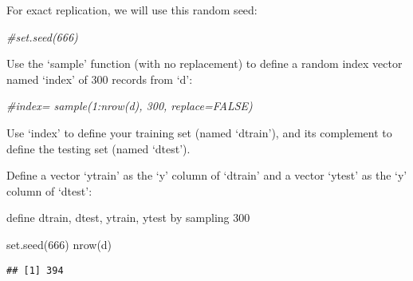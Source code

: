 \documentclass[
]{article}
\newenvironment{Shaded}{\begin{snugshade}}{\end{snugshade}}
\newcommand{\AttributeTok}[1]{\textcolor[rgb]{0.77,0.63,0.00}{#1}}
\newcommand{\CommentTok}[1]{\textcolor[rgb]{0.56,0.35,0.01}{\textit{#1}}}
\newcommand{\DecValTok}[1]{\textcolor[rgb]{0.00,0.00,0.81}{#1}}
\newcommand{\FunctionTok}[1]{\textcolor[rgb]{0.00,0.00,0.00}{#1}}
\newcommand{\NormalTok}[1]{#1}
\newcommand{\OtherTok}[1]{\textcolor[rgb]{0.56,0.35,0.01}{#1}}
\newcommand{\SpecialCharTok}[1]{\textcolor[rgb]{0.00,0.00,0.00}{#1}}
\begin{document}
For exact replication, we will use this random seed:

\begin{Shaded}
\begin{Highlighting}[]
\CommentTok{\#set.seed(666)}
\end{Highlighting}
\end{Shaded}

Use the `sample' function (with no replacement) to define a random index
vector named `index' of 300 records from `d':

\begin{Shaded}
\begin{Highlighting}[]
\CommentTok{\#index= sample(1:nrow(d), 300, replace=FALSE)}
\end{Highlighting}
\end{Shaded}

Use `index' to define your training set (named `dtrain'), and its
complement to define the testing set (named `dtest').

Define a vector `ytrain' as the `y' column of `dtrain' and a vector
`ytest' as the `y' column of `dtest':

\begin{Shaded}
\end{Shaded}

define dtrain, dtest, ytrain, ytest by sampling 300

\begin{Shaded}
\begin{Highlighting}[]
\FunctionTok{set.seed}\NormalTok{(}\DecValTok{666}\NormalTok{)}
\FunctionTok{nrow}\NormalTok{(d)}
\end{Highlighting}
\end{Shaded}

\begin{verbatim}
## [1] 394
\end{verbatim}

\begin{Shaded}
\end{Shaded}
\end{document}
